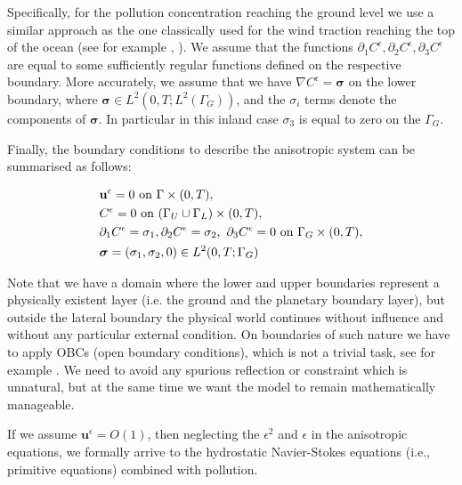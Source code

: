 \documentclass[11pt]{article}
\begin{document}
  Specifically, for the pollution concentration reaching the ground level we use a similar approach as the one classically used for the wind traction reaching the top of the ocean (see for example \cite{azerad2001mathematical}, \cite{temam2005some}). We assume that the functions $\partial_1 C^\epsilon, \partial_2 C^\epsilon, \partial_3 C^\epsilon$ are equal to some sufficiently regular functions defined on the respective boundary. More accurately, we assume that we have $\nabla C^\epsilon = \boldsymbol{\sigma}$ on the lower boundary, where $\boldsymbol{\sigma} \in L^2(0,T;L^2(\Gamma_G))$, and the $\sigma_i$ terms denote the components of $\boldsymbol{\sigma}$. In particular in this inland case $\sigma_3$ is equal to zero on the $\Gamma_G$.
  
  Finally, the boundary conditions to describe the anisotropic system can be summarised as follows:
  
    \begin{equation} \label{ANSC8}
      \begin{split}
        & \mathbf{u}^\epsilon = 0 \text{ on } \Gamma \times (0,T), \\
        &C^\epsilon = 0 \text{ on } ( \Gamma_U \cup \Gamma_L) \times (0,T), \\
        & \partial_1 C^\epsilon = \sigma_1, \partial_2 C^\epsilon = \sigma_2,\ \partial_3 C^\epsilon= 0 \text{ on } \Gamma_G \times (0,T), \\
        & \boldsymbol{\sigma} = (\sigma_1, \sigma_2, 0) \in L^2(0,T; \Gamma_G)\\
      \end{split} \raisetag{40pt}
    \end{equation}

Note that we have a domain where the lower and upper boundaries represent a physically existent layer (i.e. the ground and the planetary boundary layer), but outside the lateral boundary the physical world continues without influence and without any particular external condition. On boundaries of such nature we have to apply OBCs (open boundary conditions), which is not a trivial task, see for example \cite{wang2014ocean}. We need to avoid any spurious reflection or constraint which is unnatural, but at the same time we want the model to remain mathematically manageable.

If we assume $\mathbf{u}^\epsilon = O(1)$, then neglecting the $\epsilon^2$ and $\epsilon$ in the anisotropic equations, we formally arrive to the hydrostatic Navier-Stokes equations (i.e., primitive equations) combined with pollution.
\end{document}
